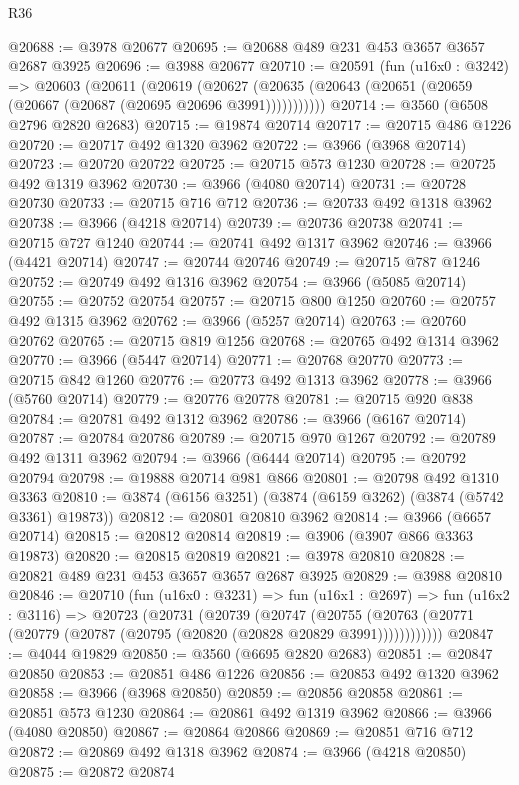 \begin{lexlean}{R36}
\begin{coremodule}
@20688 := @3978 @20677
@20695 := @20688 @489 @231 @453 @3657 @3657 @2687 @3925
@20696 := @3988 @20677
@20710 := @20591
    (fun (u16x0 : @3242) =>
    @20603
      (@20611
        (@20619
          (@20627 (@20635 (@20643 (@20651 (@20659 (@20667 (@20687 (@20695 @20696 @3991)))))))))))
@20714 := @3560 (@6508 @2796 @2820 @2683)
@20715 := @19874 @20714
@20717 := @20715 @486 @1226
@20720 := @20717 @492 @1320 @3962
@20722 := @3966 (@3968 @20714)
@20723 := @20720 @20722
@20725 := @20715 @573 @1230
@20728 := @20725 @492 @1319 @3962
@20730 := @3966 (@4080 @20714)
@20731 := @20728 @20730
@20733 := @20715 @716 @712
@20736 := @20733 @492 @1318 @3962
@20738 := @3966 (@4218 @20714)
@20739 := @20736 @20738
@20741 := @20715 @727 @1240
@20744 := @20741 @492 @1317 @3962
@20746 := @3966 (@4421 @20714)
@20747 := @20744 @20746
@20749 := @20715 @787 @1246
@20752 := @20749 @492 @1316 @3962
@20754 := @3966 (@5085 @20714)
@20755 := @20752 @20754
@20757 := @20715 @800 @1250
@20760 := @20757 @492 @1315 @3962
@20762 := @3966 (@5257 @20714)
@20763 := @20760 @20762
@20765 := @20715 @819 @1256
@20768 := @20765 @492 @1314 @3962
@20770 := @3966 (@5447 @20714)
@20771 := @20768 @20770
@20773 := @20715 @842 @1260
@20776 := @20773 @492 @1313 @3962
@20778 := @3966 (@5760 @20714)
@20779 := @20776 @20778
@20781 := @20715 @920 @838
@20784 := @20781 @492 @1312 @3962
@20786 := @3966 (@6167 @20714)
@20787 := @20784 @20786
@20789 := @20715 @970 @1267
@20792 := @20789 @492 @1311 @3962
@20794 := @3966 (@6444 @20714)
@20795 := @20792 @20794
@20798 := @19888 @20714 @981 @866
@20801 := @20798 @492 @1310 @3363
@20810 := @3874 (@6156 @3251) (@3874 (@6159 @3262) (@3874 (@5742 @3361) @19873))
@20812 := @20801 @20810 @3962
@20814 := @3966 (@6657 @20714)
@20815 := @20812 @20814
@20819 := @3906 (@3907 @866 @3363 @19873)
@20820 := @20815 @20819
@20821 := @3978 @20810
@20828 := @20821 @489 @231 @453 @3657 @3657 @2687 @3925
@20829 := @3988 @20810
@20846 := @20710
    (fun (u16x0 : @3231) =>
    fun (u16x1 : @2697) =>
    fun (u16x2 : @3116) =>
    @20723
      (@20731
        (@20739
          (@20747
            (@20755 (@20763 (@20771 (@20779 (@20787 (@20795 (@20820 (@20828 @20829 @3991))))))))))))
@20847 := @4044 @19829
@20850 := @3560 (@6695 @2820 @2683)
@20851 := @20847 @20850
@20853 := @20851 @486 @1226
@20856 := @20853 @492 @1320 @3962
@20858 := @3966 (@3968 @20850)
@20859 := @20856 @20858
@20861 := @20851 @573 @1230
@20864 := @20861 @492 @1319 @3962
@20866 := @3966 (@4080 @20850)
@20867 := @20864 @20866
@20869 := @20851 @716 @712
@20872 := @20869 @492 @1318 @3962
@20874 := @3966 (@4218 @20850)
@20875 := @20872 @20874

\end{coremodule}
\end{lexlean}
